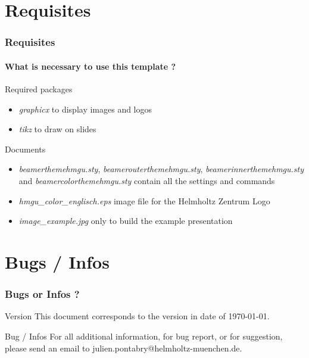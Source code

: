 \documentclass[xcolor=dvipsnames]{beamer}
\begin{document}
	\section{Requisites}
		\begin{frame}
			\frametitle{Requisites}
			\framesubtitle{What is necessary to use this template ?}
			\begin{block}{Required packages}
				\begin{itemize}
					\item \textit{graphicx} to display images and logos
					\item \textit{tikz} to draw on slides
				\end{itemize}
			\end{block}
			\begin{block}{Documents}
				\begin{itemize}
					\item \textit{beamerthemehmgu.sty}, \textit{beamerouterthemehmgu.sty}, \textit{beamerinnerthemehmgu.sty} and \textit{beamercolorthemehmgu.sty} contain all the settings and commands
					\item \textit{hmgu\_color\_englisch.eps} image file for the Helmholtz Zentrum Logo
					\item \textit{image\_example.jpg} only to build the example presentation
				\end{itemize}
			\end{block}
		\end{frame}
		
	\section{Bugs / Infos}
		\begin{frame}
			\frametitle{Bugs or Infos ?}
			\begin{exampleblock}{Version}
				This document corresponds to the version in date of \today.
			\end{exampleblock}
			\begin{alertblock}{Bug / Infos}
				For all additional information, for bug report, or for suggestion, please send an email to julien.pontabry@helmholtz-muenchen.de.
			\end{alertblock}
		\end{frame}
\end{document}
